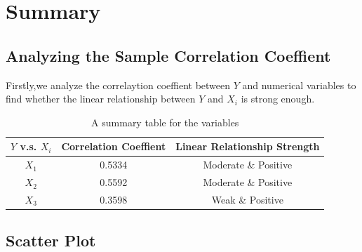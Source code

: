 \documentclass[a4paper,11pt,onecolumn,twoside]{article}
\begin{document}
\section{Summary}

\subsection{Analyzing the Sample Correlation Coeffient}
Firstly,we analyze the correlaytion coeffient between $Y$ and numerical variables to find whether the linear relationship between $Y$ and $X_i$ is strong enough.
 \begin{table}[htbp]
	\centering
	\begin{tabular}{ccc}
		\midrule[1.5pt]
		 $Y$ v.s. $X_i$&Correlation Coeffient & Linear Relationship Strength\\
		\hline
	    $X_1$ &  0.5334& Moderate \& Positive\\
		$X_2$ &  0.5592 &Moderate \& Positive  \\
		$X_3$ &  0.3598& Weak \& Positive  \\
		\midrule[1.5pt]
	\end{tabular}
	\caption{A summary table for the variables }
\end{table}
\subsection{Scatter Plot}
\end{document}
